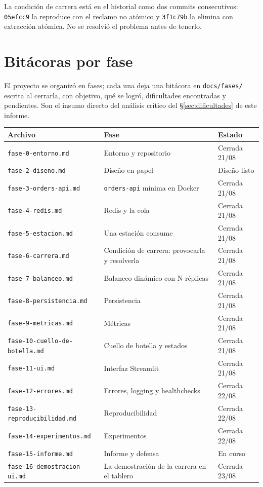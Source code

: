 \documentclass[12pt,a4paper]{article}
\begin{document}
La condición de carrera está en el historial como dos commits consecutivos:
\texttt{05efcc9} la reproduce con el reclamo no atómico y \texttt{3f1c79b} la
elimina con extracción atómica. No se resolvió el problema antes de tenerlo.

\newpage
\section{Bitácoras por fase}
\label{anexo:fases}

El proyecto se organizó en fases; cada una deja una bitácora en
\texttt{docs/fases/} escrita al cerrarla, con objetivo, qué se logró,
dificultades encontradas y pendientes. Son el insumo directo del análisis
crítico del §\ref{sec:dificultades} de este informe.

\begin{table}[H]
\centering
\footnotesize
\begin{tabular}{@{}lp{7.4cm}l@{}}
\toprule
\textbf{Archivo} & \textbf{Fase} & \textbf{Estado} \\
\midrule
\texttt{fase-0-entorno.md} & Entorno y repositorio & Cerrada 21/08 \\
\texttt{fase-2-diseno.md} & Diseño en papel & Diseño listo \\
\texttt{fase-3-orders-api.md} & \texttt{orders-api} mínima en Docker & Cerrada 21/08 \\
\texttt{fase-4-redis.md} & Redis y la cola & Cerrada 21/08 \\
\texttt{fase-5-estacion.md} & Una estación consume & Cerrada 21/08 \\
\texttt{fase-6-carrera.md} & Condición de carrera: provocarla y resolverla & Cerrada 21/08 \\
\texttt{fase-7-balanceo.md} & Balanceo dinámico con N réplicas & Cerrada 21/08 \\
\texttt{fase-8-persistencia.md} & Persistencia & Cerrada 21/08 \\
\texttt{fase-9-metricas.md} & Métricas & Cerrada 21/08 \\
\texttt{fase-10-cuello-de-botella.md} & Cuello de botella y estados & Cerrada 21/08 \\
\texttt{fase-11-ui.md} & Interfaz Streamlit & Cerrada 21/08 \\
\texttt{fase-12-errores.md} & Errores, logging y healthchecks & Cerrada 22/08 \\
\texttt{fase-13-reproducibilidad.md} & Reproducibilidad & Cerrada 22/08 \\
\texttt{fase-14-experimentos.md} & Experimentos & Cerrada 22/08 \\
\texttt{fase-15-informe.md} & Informe y defensa & En curso \\
\texttt{fase-16-demostracion-ui.md} & La demostración de la carrera en el tablero & Cerrada 23/08 \\
\bottomrule
\end{tabular}
\end{table}
\end{document}
